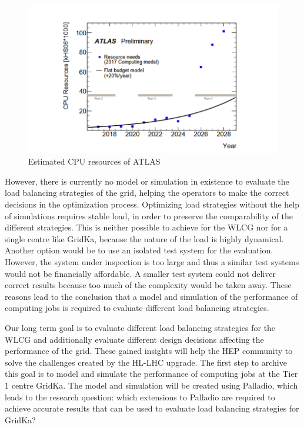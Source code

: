 \begin{figure}
	\centering
	\includegraphics[width=1.0\linewidth]{images/resources}
	\caption[]{Estimated CPU resources of ATLAS \cite{community}}
	\label{resources}
\end{figure}



However, there is currently no model or simulation in existence to evaluate the load balancing strategies of the grid, helping the operators to make the correct decisions in the optimization process.
Optimizing load strategies without the help of simulations requires stable load, in order to preserve the comparability of the different strategies. This is neither possible to achieve for the WLCG nor for a single centre like GridKa, because the nature of the load is highly dynamical. Another option would be to use an isolated test system for the evaluation. However, the system under inspection is too large and thus a similar test systems would not be financially affordable. A smaller test system could not deliver correct results because too much of the complexity would be taken away.
These reasons lead to the conclusion that a model and simulation of the performance of computing jobs is required to evaluate different load balancing strategies.

Our long term goal is to evaluate different load balancing strategies for the WLCG and additionally evaluate different design decisions affecting the performance of the grid. These gained insights will help the HEP community to solve the challenges created by the HL-LHC upgrade.
The first step to archive this goal is to model and simulate the performance of computing jobs at the Tier 1 centre GridKa.
The model and simulation will be created using Palladio, which leads to the research question: which extensions to Palladio are required to achieve accurate results that can be used to evaluate load balancing strategies for GridKa?

